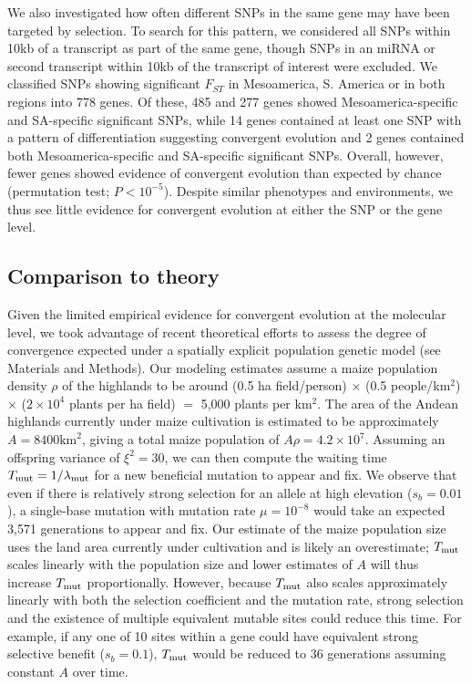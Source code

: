 We also investigated how often different SNPs in the same gene may have been targeted by selection. 
To search for this pattern, we considered all SNPs within 10kb of a transcript as part of the same gene, though SNPs in an miRNA or second transcript within 10kb of the transcript of interest were excluded.  
We classified SNPs showing significant $F_{ST}$ in Mesoamerica, S. America or in both regions into 778 genes. 
Of these, 485 and 277 genes showed Mesoamerica-specific and SA-specific significant SNPs, while 14 genes contained at least one SNP with a pattern of differentiation suggesting convergent evolution and 2 genes contained both Mesoamerica-specific and SA-specific significant SNPs. 
Overall, however, fewer genes showed evidence of convergent evolution than expected by chance (permutation test; $P<10^{-5}$). 
Despite similar phenotypes and environments, we thus see little evidence for convergent evolution at either the SNP or the gene level.  

\subsection*{Comparison to theory}


Given the limited empirical evidence for convergent evolution at the molecular level, we took advantage of recent theoretical efforts \cite[]{ralph2014convergent} to assess the degree of convergence expected under a spatially explicit population genetic model (see Materials and Methods).
Our modeling estimates assume a maize population density $\rho$ of the highlands to be around (0.5 ha field/person) $\times$ (0.5 people/km$^2$) $\times$ ($2\times 10^4$ plants per ha field) $=$ 5,000 plants per km$^2$.
The area of the Andean highlands currently under maize cultivation is estimated to be approximately $A=8400\text{km}^2$, giving a total maize population of $A \rho = 4.2 \times 10^7$. 
Assuming an offspring variance of $\xi^2 = 30$, we can then compute the waiting time $T_{\text{mut}}=1/\lambda_{\text{mut}}$ for a new beneficial mutation to appear and fix.
We observe that even if there is relatively strong selection for an allele at high elevation ($s_b=0.01$), a single-base mutation with mutation rate $\mu=10^{-8}$ would take an expected 3,571 generations to appear and fix.
Our estimate of the maize population size uses the land area currently under cultivation and is likely an overestimate; $T_{\text{mut}}$ scales linearly with the population size and lower estimates of $A$ will thus increase $T_{\text{mut}}$ proportionally.
However, because $T_{\text{mut}}$ also scales approximately linearly with both the selection coefficient and the mutation rate, strong selection and the existence of multiple equivalent mutable sites could reduce this time. 
For example, if any one of 10 sites within a gene could have equivalent strong selective benefit ($s_b=0.1$), $T_{\text{mut}}$ would be reduced to 36 generations assuming constant $A$ over time. 

